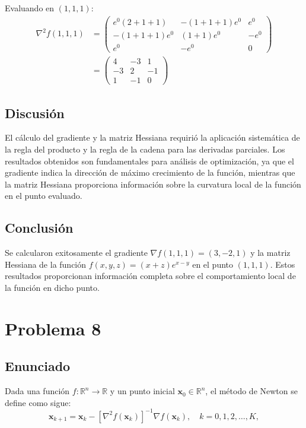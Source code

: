 \documentclass{article}
\begin{document}
Evaluando en $(1, 1, 1)$:
\begin{align}
\nabla^2 f(1,1,1) &= \begin{pmatrix}
e^0(2 + 1 + 1) & -(1 + 1 + 1)e^0 & e^0 \\
-(1 + 1 + 1)e^0 & (1 + 1)e^0 & -e^0 \\
e^0 & -e^0 & 0
\end{pmatrix} \\
&= \begin{pmatrix}
4 & -3 & 1 \\
-3 & 2 & -1 \\
1 & -1 & 0
\end{pmatrix}
\end{align}

\subsection{Discusión}
El cálculo del gradiente y la matriz Hessiana requirió la aplicación sistemática de la regla del producto y la regla de la cadena para las derivadas parciales. Los resultados obtenidos son fundamentales para análisis de optimización, ya que el gradiente indica la dirección de máximo crecimiento de la función, mientras que la matriz Hessiana proporciona información sobre la curvatura local de la función en el punto evaluado.

\subsection{Conclusión}
Se calcularon exitosamente el gradiente $\nabla f(1,1,1) = (3, -2, 1)$ y la matriz Hessiana de la función $f(x, y, z) = (x + z)e^{x-y}$ en el punto $(1, 1, 1)$. Estos resultados proporcionan información completa sobre el comportamiento local de la función en dicho punto.

\section{Problema 8}

\subsection{Enunciado}
Dada una función $f : \mathbb{R}^n \to \mathbb{R}$ y un punto inicial $\mathbf{x}_0 \in \mathbb{R}^n$, el método de Newton se define como sigue:
$$\mathbf{x}_{k+1} = \mathbf{x}_k - [\nabla^2 f(\mathbf{x}_k)]^{-1} \nabla f(\mathbf{x}_k), \quad k = 0, 1, 2, \ldots, K,$$
\end{document}
